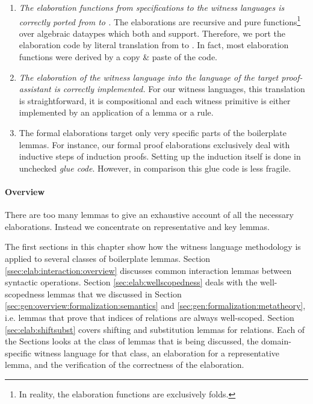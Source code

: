 \begin{enumerate}
\item \emph{The elaboration functions from \Knot specifications to the witness
  languages is correctly ported from \Coq to \Haskell.} The elaborations are
  recursive and pure functions\footnote{In reality, the elaboration functions
    are exclusively folds.} over algebraic dataypes which both \Coq and \Haskell
  support. Therefore, we port the elaboration code by literal translation from
  \Coq to \Haskell. In fact, most \Haskell elaboration functions were derived by
  a copy \& paste of the \Coq code.

\item \emph{The elaboration of the witness language into the language of the
  target proof-assistant is correctly implemented.} For our witness languages,
  this translation is straightforward, it is compositional and each witness
  primitive is either implemented by an application of a lemma or a rule.

\item The formal elaborations target only very specific parts of the boilerplate
  lemmas. For instance, our formal proof elaborations exclusively deal with
  inductive steps of induction proofs. Setting up the induction itself is done
  in unchecked \emph{glue code}. However, in comparison this glue code is less
  fragile.
\end{enumerate}



\paragraph{Overview}

There are too many lemmas to give an exhaustive account of all the
necessary elaborations. Instead we concentrate on representative and key lemmas.

The first sections in this chapter show how the witness language methodology is
applied to several classes of boilerplate lemmas. Section
\ref{ssec:elab:interaction:overview} discusses common interaction lemmas between
syntactic operations. Section \ref{sec:elab:wellscopedness} deals with the
well-scopedness lemmas that we discussed in Section
\ref{sec:gen:overview:formalization:semantics} and
\ref{sec:gen:formalization:metatheory}, i.e. lemmas that prove that indices of
relations are always well-scoped. Section \ref{sec:elab:shiftsubst} covers
shifting and substitution lemmas for relations. Each of the Sections looks at
the class of lemmas that is being discussed, the domain-specific witness
language for that class, an elaboration for a representative lemma, and the
verification of the correctness of the elaboration.

